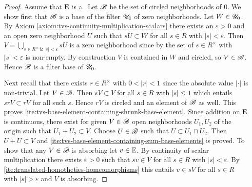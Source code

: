 \begin{proof}
  Assume that $\mathrm{E}$ is a  \tvs\  Let $\mathscr{B}$ be the set of circled neighborhoods of $0$. We show first that
  $\mathscr{B}$ is a base of the filter $\mathscr{U}_0$ of zero neighborhoods. Let $W \in \mathscr{U}_0$. 
  By Axiom \ref{axiom:tvs-continuity-multiplication-scalars} there exists an $\varepsilon >0$ and an open
  zero neighborhood $U$ such that $sU \subset W$ for all $s\in R$ with $|s|<\varepsilon$.
  Then $V = \bigcup\limits_{s\in R^\times \:\&\: |s|<\varepsilon} sU $ is a zero neighborhood since
  by  the set of $s\in R^\times$
  with $|s|<\varepsilon$ is non-empty. By construction $V$ is contained in $W$ and circled, so $V \in \mathscr{B}$.
  Hence $\mathscr{B}$ is a filter base of $\mathscr{U}_0$.

  Next recall that  there exists $r\in R^\times$ with $0<|r|<1$ since the absolute value $|\cdot|$ is non-trivial.
  Let $V\in \mathscr{B}$. Then $sV\subset V$ for all $s\in R$ with $|s|\leq 1$ which entails $srV \subset rV$ for all
  such $s$. Hence $rV$ is circled and an element of $\mathscr{B}$ as well. This proves
  \ref{ite:tvs-base-element-containing-shrunk-base-element}.
  Since addition on $\mathrm{E}$ is continuous, there exist for given $V\in \mathscr{B}$ open neighborhoods
  $U_1,U_2$ of the origin such that $U_1+U_2\subset V$. Choose $U\in \mathscr{B}$ such that $U \subset U_1 \cap U_2$.
  Then $U + U \subset V$ and \ref{ite:tvs-base-element-containing-sum-base-elements} is proved.
  To show that any $V\in\mathscr{B}$ is absorbing let $v\in \mathrm{E}$. By continuity of scalar multiplication
  there exists $\varepsilon >0$  such that $sv \in V $ for all $s\in R$ with $|s|<\varepsilon$.
  By  \ref{ite:translated-homotheties-homeomorphisms}
  this entails $v \in sV $ for all $s\in R$ with $|s|>\varepsilon$ and $V$ is absorbing. 


\end{proof}
